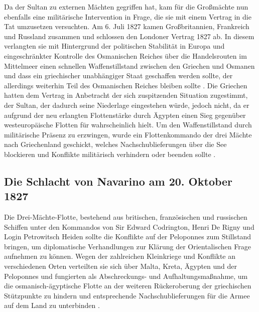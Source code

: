 \documentclass[preprint]{geomorphica} %
\begin{document}
Da der Sultan zu externen Mächten gegriffen hat, kam für die Großmächte nun ebenfalls eine militärische Intervention in Frage, die sie mit einem Vertrag in die Tat umzusetzen versuchten. 
Am 6. Juli 1827 kamen Großbritannien, Frankreich und Russland zusammen und schlossen den Londoner Vertrag 1827 ab.
In diesem verlangten sie mit Hintergrund der politischen Stabilität in Europa und eingeschränkter Kontrolle des Osmanischen Reiches über die Handelsrouten im Mittelmeer einen schnellen Waffenstillstand zwischen den Griechen und Osmanen und dass ein griechischer unabhängiger Staat geschaffen werden sollte, der allerdings weiterhin Teil des Osmanischen Reiches bleiben sollte \cite{Zelepos2015, Schulz2011}.
Die Griechen hatten dem Vertrag in Anbetracht der sich zuspitzenden Situation zugestimmt, der Sultan, der dadurch seine Niederlage eingestehen würde, jedoch nicht, da er aufgrund der neu erlangten Flottenstärke durch Ägypten einen Sieg gegenüber westeuropäische Flotten für wahrscheinlich hielt. 
Um den Waffenstillstand durch militärische Präsenz zu erzwingen, wurde ein Flottenkommando der drei Mächte nach Griechenland geschickt, welches Nachschublieferungen über die See blockieren und Konflikte militärisch verhindern oder beenden sollte \cite{Zelepos2015, Brewer2001, Dakin1973, Woodhouse1965}.

\subsection{Die Schlacht von Navarino am 20. Oktober 1827}

Die Drei-Mächte-Flotte, bestehend aus britischen, französischen und russischen Schiffen unter den Kommandos von Sir Edward Codrington, Henri De Rigny und Login Petrowitsch Heiden sollte die Konflikte auf der Peloponnes zum Stillstand bringen, um diplomatische Verhandlungen zur Klärung der Orientalischen Frage aufnehmen zu können.
Wegen der zahlreichen Kleinkriege und Konflikte an verschiedenen Orten verteilten sie sich über Malta, Kreta, Ägypten und der Peloponnes und fungierten als Abschreckungs- und Aufhaltungsmaßnahme, um die osmanisch-ägyptische Flotte an der weiteren Rückeroberung der griechischen Stützpunkte zu hindern und entsprechende Nachschublieferungen für die Armee auf dem Land zu unterbinden \cite{Dakin1973, Woodhouse1965}.
\end{document}

